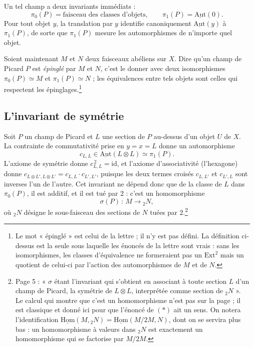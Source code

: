 \documentclass[11pt,a4paper]{article}
\begin{document}
Un tel champ a deux invariants immédiats :
\[ \pi_0(P) = \text{faisceau des classes d'objets}, \qquad
   \pi_1(P) = \underline{\mathrm{Aut}}(0). \]
Pour tout objet $y$, la translation par $y$ identifie canoniquement
$\underline{\mathrm{Aut}}(y)$ à $\pi_1(P)$, de sorte que $\pi_1(P)$ mesure les
automorphismes de n'importe quel objet.

Soient maintenant $M$ et $N$ deux faisceaux abéliens sur $X$. Dire qu'un champ
de Picard $P$ est \emph{épinglé} par $M$ et $N$, c'est le donner avec deux
isomorphismes $\pi_0(P) \simeq M$ et $\pi_1(P) \simeq N$ ; les équivalences
entre tels objets sont celles qui respectent les épinglages.\footnote{Le mot
« épinglé » est celui de la lettre ; il n'y est pas défini. La définition
ci-dessus est la seule sous laquelle les énoncés de la lettre sont vrais :
sans les isomorphismes, les classes d'équivalence ne formeraient pas un
$\mathrm{Ext}^2$ mais un quotient de celui-ci par l'action des automorphismes
de $M$ et de $N$.}

\subsection*{L'invariant de symétrie}

Soit $P$ un champ de Picard et $L$ une section de $P$ au-dessus d'un objet $U$
de $X$. La contrainte de commutativité prise en $y = x = L$ donne un
automorphisme
\[ c_{L,L} \in \underline{\mathrm{Aut}}(L \otimes L) \simeq \pi_1(P) . \]
L'axiome de symétrie donne $c_{L,L}^{\,2} = \mathrm{id}$, et l'axiome
d'associativité (l'hexagone) donne
$c_{L \otimes L', L \otimes L'} = c_{L,L} \cdot c_{L',L'}$, puisque les deux
termes croisés $c_{L,L'}$ et $c_{L',L}$ sont inverses l'un de l'autre. Cet
invariant ne dépend donc que de la classe de $L$ dans $\pi_0(P)$, il est
additif, et il est tué par $2$ : c'est un homomorphisme
\[ \sigma(P) \,:\, M \longrightarrow {}_2 N , \]
où ${}_2 N$ désigne le sous-faisceau des sections de $N$ tuées par
$2$.\footnote{Page 5 : « $\sigma$ étant l'invariant qui s'obtient en associant à toute section
$L$ d'un champ de Picard, la symétrie de $L \otimes L$, interprétée comme
section de ${}_2N$ ». Le calcul qui montre que c'est un homomorphisme n'est
pas sur la page ; il est classique et donné ici pour que l'énoncé de $(*)$ ait
un sens. On notera l'identification $\underline{\mathrm{Hom}}(M, {}_2N) =
\underline{\mathrm{Hom}}(M/2M, N)$, dont on se servira plus bas : un
homomorphisme à valeurs dans ${}_2N$ est exactement un homomorphisme qui se
factorise par $M/2M$.}
\end{document}
